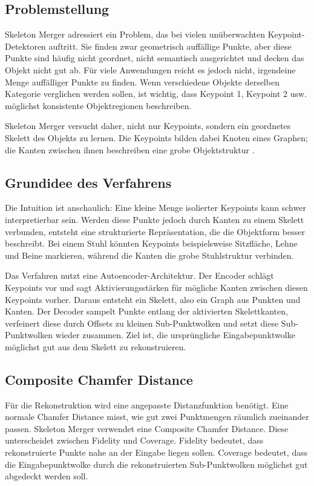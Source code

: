 \documentclass[11pt,a4paper]{article}
\begin{document}
\subsection{Problemstellung}

Skeleton Merger adressiert ein Problem, das bei vielen unüberwachten Keypoint-Detektoren auftritt. Sie finden zwar geometrisch auffällige Punkte, aber diese Punkte sind häufig nicht geordnet, nicht semantisch ausgerichtet und decken das Objekt nicht gut ab. Für viele Anwendungen reicht es jedoch nicht, irgendeine Menge auffälliger Punkte zu finden. Wenn verschiedene Objekte derselben Kategorie verglichen werden sollen, ist wichtig, dass Keypoint 1, Keypoint 2 usw. möglichst konsistente Objektregionen beschreiben.

Skeleton Merger versucht daher, nicht nur Keypoints, sondern ein geordnetes Skelett des Objekts zu lernen. Die Keypoints bilden dabei Knoten eines Graphen; die Kanten zwischen ihnen beschreiben eine grobe Objektstruktur \cite{shi2021skeletonmerger}.

\subsection{Grundidee des Verfahrens}

Die Intuition ist anschaulich: Eine kleine Menge isolierter Keypoints kann schwer interpretierbar sein. Werden diese Punkte jedoch durch Kanten zu einem Skelett verbunden, entsteht eine strukturierte Repräsentation, die die Objektform besser beschreibt. Bei einem Stuhl könnten Keypoints beispielsweise Sitzfläche, Lehne und Beine markieren, während die Kanten die grobe Stuhlstruktur verbinden.

Das Verfahren nutzt eine Autoencoder-Architektur. Der Encoder schlägt Keypoints vor und sagt Aktivierungsstärken für mögliche Kanten zwischen diesen Keypoints vorher. Daraus entsteht ein Skelett, also ein Graph aus Punkten und Kanten. Der Decoder sampelt Punkte entlang der aktivierten Skelettkanten, verfeinert diese durch Offsets zu kleinen Sub-Punktwolken und setzt diese Sub-Punktwolken wieder zusammen. Ziel ist, die ursprüngliche Eingabepunktwolke möglichst gut aus dem Skelett zu rekonstruieren.

\subsection{Composite Chamfer Distance}

Für die Rekonstruktion wird eine angepasste Distanzfunktion benötigt. Eine normale Chamfer Distance misst, wie gut zwei Punktmengen räumlich zueinander passen. Skeleton Merger verwendet eine Composite Chamfer Distance. Diese unterscheidet zwischen Fidelity und Coverage. Fidelity bedeutet, dass rekonstruierte Punkte nahe an der Eingabe liegen sollen. Coverage bedeutet, dass die Eingabepunktwolke durch die rekonstruierten Sub-Punktwolken möglichst gut abgedeckt werden soll.
\end{document}
